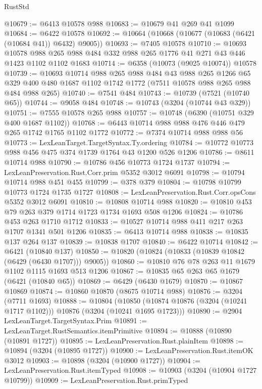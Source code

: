 \begin{lexlean}{RustStd}
\begin{coremodule}
@10679 := @6413 @10578 @988
@10683 := @10679 @41 @269 @41 @1099
@10684 := @6422 @10578
@10692 := @10664 (@10668 (@10677 (@10683 (@6421 (@10684 @41)) @6432) @9005))
@10693 := @7405 @10578
@10710 := @10693
    @10578
    @988
    @265
    @988
    @484
    @332
    @988
    @265
    @1776
    @41
    @271
    @43
    @446
    @1423
    @1102
    @1102
    @1683
@10714 := @6358 (@10073 (@9025 @10074)) @10578
@10739 := @10693
    @10714
    @988
    @265
    @988
    @484
    @43
    @988
    @265
    @1266
    @65
    @329
    @400
    @480
    @1687
    @1102
    @1742
    @1772
    (@7511 @10578 @988 @265 @988 @484 @988 @265)
@10740 := @7541 @484
@10743 := @10739 (@7521 (@10740 @65))
@10744 := @9058 @484
@10748 := @10743 (@3204 (@10744 @43 @329))
@10751 := @7555 @10578 @265 @988
@10757 := @10748 (@6390 (@10751 @329 @400 @1687 @1102))
@10768 := @6443 @10714 @988 @988 @476 @446 @479 @265 @1742 @1765 @1102 @1772
@10772 := @7374 @10714 @988 @988 @56
@10773 := LexLeanTarget.TargetSyntax.Ty.ordering
@10784 := @10772 @10773 @988 @456 @475 @374 @1739 @1764 @43 @1200 @526 @1206
@10786 := @8611 @10714 @988
@10790 := @10786 @456 @10773 @1724 @1737
@10794 := LexLeanPreservation.Rust.Corr.prim @5352 @3012 @6091
@10798 := @10794 @10714 @988 @451 @455
@10799 := @378 @379
@10804 := @10798 @10799 @10773 @1724 @1735 @1727
@10808 := LexLeanPreservation.Rust.Corr.opsCons @5352 @3012 @6091
@10810 := @10808 @10714 @988
@10820 := @10810 @453 @79 @263 @379 @1714 @1723 @1734 @1693 @508 @1206
@10824 := @10786 @453 @263 @1710 @1712
@10833 := @10527 @10714 @988 @411 @217 @263 @1707 @1341 @501 @1206
@10835 := @6413 @10714 @988
@10838 := @10835 @137 @264 @137
@10839 := @10838 @1707
@10840 := @6422 @10714
@10842 := @6421 (@10840 @137)
@10850 := @10820 (@10824 (@10833 (@10839 @10842 (@6429 (@6430 @1707))) @9005))
@10860 := @10810 @76 @78 @263 @11 @1679 @1102 @1115 @1693 @513 @1206
@10867 := @10835 @65 @263 @65 @1679 (@6421 (@10840 @65))
@10869 := @6429 (@6430 @1679)
@10870 := @10867 @10869
@10874 := @10860 @10870 (@8675 @10714 @988)
@10876 := @3204 (@7711 @1693)
@10888 := @10804
    (@10850 (@10874 @10876 (@3204 (@10241 @1717 @1102))) @10876 (@3204 (@10241 @1695 @1723)))
@10890 := @2904 LexLeanTarget.TargetSyntax.Prim
@10891 := LexLeanTarget.RustSemantics.itemPrimitive
@10894 := @10888 (@10890 (@10891 @1727))
@10895 := LexLeanPreservation.Rust.plainItem
@10898 := @10894 (@3204 (@10895 @1727))
@10900 := LexLeanPreservation.Rust.itemOK @3012
@10903 := @10898 (@3204 (@10900 @1727))
@10904 := LexLeanPreservation.Rust.itemTyped
@10908 := @10903 (@3204 (@10904 @1727 @10799))
@10909 := LexLeanPreservation.Rust.primTyped

\end{coremodule}
\end{lexlean}
